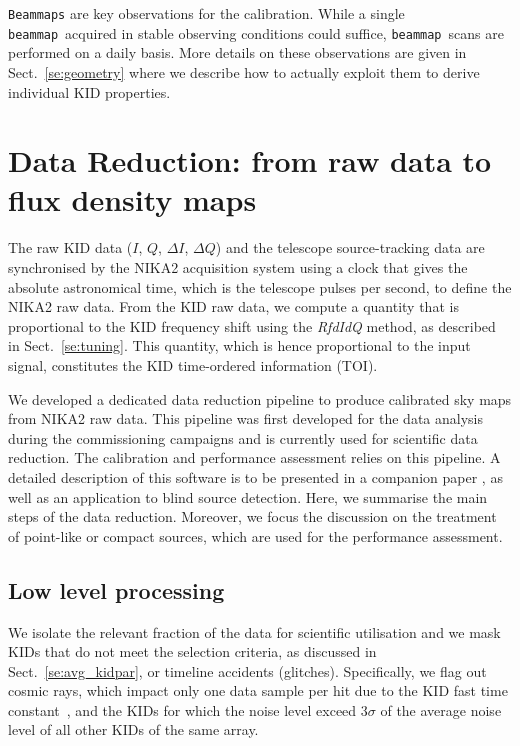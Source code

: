 \documentclass[traditionalabstract]{aa}
\newcommand{\bm}{{\tt beammap}}
\newcommand{\lp}[1]{#1}
\begin{document}
{{\tt Beammaps} are key observations for the calibration. {\lp While
a single \bm\ acquired in stable observing conditions could suffice,
\bm\ scans are performed on a daily basis.}
More details on these observations are given in Sect.~\ref{se:geometry}
where we describe how to actually exploit them to derive individual KID
properties.


\section{Data Reduction: from raw data to flux density maps}
\label{se:dataproc}
%

The raw KID data ($I$, $Q$, $\Delta I$, $\Delta Q$) and the telescope
source-tracking data are synchronised by the NIKA2 acquisition system using a
clock that gives the absolute astronomical time, which is the telescope
pulses per second, to define the NIKA2 raw data. From the KID raw
data, we compute a quantity that is proportional to the KID
frequency shift using the \emph{RfdIdQ} method, as described in
Sect.~\ref{se:tuning}. This quantity, which is hence proportional to
the input signal, constitutes the KID time-ordered information (TOI).

We developed a dedicated data reduction pipeline to
produce calibrated sky maps from NIKA2 raw data. This pipeline was first 
developed for the data analysis during the commissioning campaigns and
is currently used for scientific data reduction. The calibration
and performance assessment relies on this pipeline. 
A detailed description of this software is to be presented in a companion
paper \citep{Ponthieu2019}, as well as an application to blind source
detection. Here, we summarise the main steps of the data
reduction. {\lp Moreover, we focus the discussion on the treatment of
point-like or compact sources, which are used for the
performance assessment.}

\subsection{Low level processing}
\label{se:ll_proc}
We isolate the relevant fraction of the data for scientific
utilisation and {\lp we mask KIDs that do not meet the selection criteria, as
discussed in Sect.~\ref{se:avg_kidpar},} or
timeline accidents (glitches). Specifically, we flag out cosmic rays,
which impact only one data sample per hit due to the KID fast time
constant~\citep{Catalano2014},
and the KIDs for which the noise level exceed $3\sigma$ of the average
noise level of all other KIDs of the same array.  

}
\end{document}
